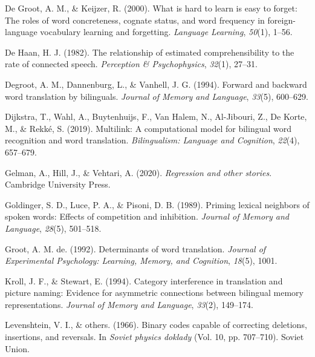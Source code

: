 \documentclass[
  english,
  man,floatsintext]{apa6}
\newlength{\cslhangindent}
\newenvironment{CSLReferences}[2] %
 {%
  \setlength{\parindent}{0pt}
  \ifodd #1 \everypar{\setlength{\hangindent}{\cslhangindent}}\ignorespaces\fi
  \ifnum #2 > 0
  \setlength{\parskip}{#2\baselineskip}
  \fi
 }%
 {}
\begin{document}
\begin{CSLReferences}{1}{0}
\leavevmode{}%
De Groot, A. M., \& Keijzer, R. (2000). What is hard to learn is easy to forget: The roles of word concreteness, cognate status, and word frequency in foreign-language vocabulary learning and forgetting. \emph{Language Learning}, \emph{50}(1), 1--56.

\leavevmode{}%
De Haan, H. J. (1982). The relationship of estimated comprehensibility to the rate of connected speech. \emph{Perception \& Psychophysics}, \emph{32}(1), 27--31.

\leavevmode{}%
Degroot, A. M., Dannenburg, L., \& Vanhell, J. G. (1994). Forward and backward word translation by bilinguals. \emph{Journal of Memory and Language}, \emph{33}(5), 600--629.

\leavevmode{}%
Dijkstra, T., Wahl, A., Buytenhuijs, F., Van Halem, N., Al-Jibouri, Z., De Korte, M., \& Rekké, S. (2019). Multilink: A computational model for bilingual word recognition and word translation. \emph{Bilingualism: Language and Cognition}, \emph{22}(4), 657--679.

\leavevmode{}%
Gelman, A., Hill, J., \& Vehtari, A. (2020). \emph{Regression and other stories}. Cambridge University Press.

\leavevmode{}%
Goldinger, S. D., Luce, P. A., \& Pisoni, D. B. (1989). Priming lexical neighbors of spoken words: Effects of competition and inhibition. \emph{Journal of Memory and Language}, \emph{28}(5), 501--518.

\leavevmode{}%
Groot, A. M. de. (1992). Determinants of word translation. \emph{Journal of Experimental Psychology: Learning, Memory, and Cognition}, \emph{18}(5), 1001.

\leavevmode{}%
Kroll, J. F., \& Stewart, E. (1994). Category interference in translation and picture naming: Evidence for asymmetric connections between bilingual memory representations. \emph{Journal of Memory and Language}, \emph{33}(2), 149--174.

\leavevmode{}%
Levenshtein, V. I., \& others. (1966). Binary codes capable of correcting deletions, insertions, and reversals. In \emph{Soviet physics doklady} (Vol. 10, pp. 707--710). Soviet Union.


\end{CSLReferences}
\end{document}
